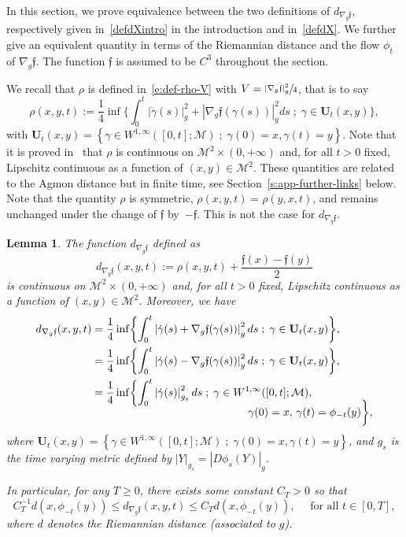 \documentclass[JEP,XML,SOM,Unicode]{cedram}
\newcommand{\sep}{\;;\;}
\newtheorem{lemma}{Lemma}[section]
\theoremstyle{definition}
\newcommand{\M}{\ensuremath{\mathcal M}}
\newcommand{\f}{\ensuremath{\mathfrak{f}}}
\newcommand\nablag{\nabla_{g}}
\begin{document}
In this section, we prove equivalence between the two definitions of $d_{\nablag \f}$, respectively given in~\eqref{defdXintro} in the introduction and in~\eqref{defdX}.
We further give an equivalent quantity in terms of the Riemannian distance and the flow $\phi_t$ of $\nablag\f$. The function $\f$ is assumed to be $C^{3}$ throughout the section.

We recall that $\rho$ is defined in~\eqref{e:def-rho-V} with $V= \sfrac{|\nabla_g \f|_g^2}{4}$, that is to say
\begin{equation}
\label{e:def-rho}
\rho(x,y,t):=\frac{1}{4} \inf \biggl\{ \int_0^t |\dot{\gamma}(s)|_g^2 +|\nabla_g\f(\gamma(s))|_g^2 ds\sep \gamma \in \mathbf{U}_t(x,y) \biggr\},
\end{equation}
with $\mathbf{U}_t(x,y)= \left\{ \gamma \in W^{1,\infty} ([0,t] ; \M )\sep\gamma(0)=x, \gamma(t)= y \right\}$.
Note that it is proved in~\cite[App.]{LY86} that $\rho$ is continuous on $\M^2 \times (0,+\infty)$ and, for all $t>0$ fixed, Lipschitz continuous as a function of $(x,y)\in \M^2$.
These quantities are related to the Agmon distance but in finite time, see Section~\ref{s:app-further-links} below. Note that the quantity $\rho$ is symmetric, $\rho(x,y,t) = \rho(y,x,t)$, and remains unchanged under the change of $\f$ by~$-\f$.
This is not the case for $d_{\nablag \f}$.

\begin{lemma}
\label{lmdist}
The function $d_{\nablag \f}$ defined as
\begin{equation}
\label{e:def-dX}
d_{\nablag \f}(x,y,t) := \rho(x,y,t)+\frac{\f(x)-\f(y)}{2}
\end{equation}
is continuous on $\M^2 \times (0,+\infty)$ and, for all $t>0$ fixed, Lipschitz continuous as a function of $(x,y)\in \M^2$. Moreover, we have
\begin{align}
\label{e:equiv-def-dx}
d_{\nablag \f}(x,y,t)&=\frac{1}{4} \inf \biggl\{ \int_0^t \left|\dot{\gamma}(s)+\nablag\f(\gamma(s))\right|_g^{2} ds\sep \gamma \in \mathbf{U}_t(x,y) \biggr\}, \\
\label{defdXappend}&=\frac{1}{4} \inf \biggl\{ \int_0^t \left|\dot{\gamma}(s)-\nablag\f(\gamma(s))\right|_g^{2} ds\sep \gamma \in \mathbf{U}_t(x,y) \biggr\},\\
\label{defdXbisappend}&=\frac{1}{4} \inf \biggl\{ \int_0^t \left|\dot{\gamma}(s)\right|_{g_s}^{2} ds\sep \gamma \in W^{1,\infty} ([0,t] ; \M ),\\[-10pt]
&\hspace*{5cm}\gamma(0)=x,\,\gamma(t)= \phi_{-t}(y) \biggr\},\notag
\end{align}
where $\mathbf{U}_t(x,y)= \left\{ \gamma \in W^{1,\infty} ([0,t] ; \M )\sep\gamma(0)=x, \gamma(t)= y \right\}$, and
$g_s$ is the time varying metric defined by $ \left|Y\right|_{g_s}= \left|D\phi_s(Y)\right|_{g}$.

In particular, for any $T\geq 0$, there exists some constant $C_T>0$ so that
\[
C_T^{-1}d(x,\phi_{-t}(y))\leq d_{\nablag \f}(x,y,t)\leq C_T d(x,\phi_{-t}(y)), \quad \text{ for all } t\in [0,T],
\]
where $d$ denotes the Riemannian distance (associated to $g$).
\end{lemma}
\end{document}
